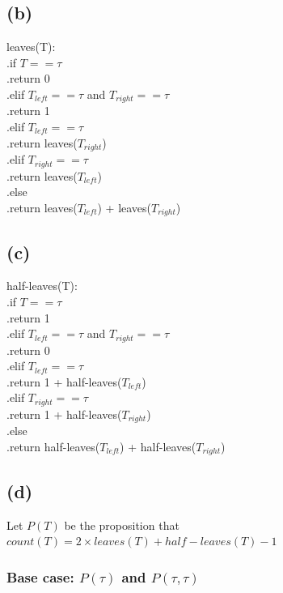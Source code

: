 \documentclass{article} %
\begin{document}
\subsection*{(b)}
leaves(T):\\
.\qquad if $T == \tau$\\
.\qquad\qquad return 0\\
.\qquad elif $T_{left} == \tau$ and $T_{right} == \tau$\\
.\qquad\qquad return 1\\
.\qquad elif $T_{left} == \tau$\\
.\qquad\qquad return leaves($T_{right}$)\\
.\qquad elif $T_{right} == \tau$\\
.\qquad\qquad return leaves($T_{left}$)\\
.\qquad else\\
.\qquad\qquad return leaves($T_{left}$) + leaves($T_{right}$)\\

\subsection*{(c)}
half-leaves(T):\\
.\qquad if $T == \tau$\\
.\qquad\qquad return 1\\
.\qquad elif $T_{left} == \tau$ and $T_{right} == \tau$\\
.\qquad\qquad return 0\\
.\qquad elif $T_{left} == \tau$\\
.\qquad\qquad return 1 + half-leaves($T_{left}$)\\
.\qquad elif $T_{right} == \tau$\\
.\qquad\qquad return 1 + half-leaves($T_{right}$)\\
.\qquad else\\
.\qquad\qquad return half-leaves($T_{left}$) + half-leaves($T_{right}$)\\


\subsection*{(d)}
Let $P(T)$ be the proposition that $count(T) = 2 \times leaves(T) + half-leaves(T) - 1$\\
\subsubsection*{Base case: $P(\tau)$ and $P(\tau,\tau)$}
\end{document}
